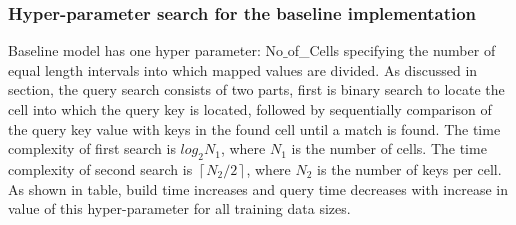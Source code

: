 \subsubsection {Hyper-parameter search for the baseline implementation}
Baseline model has one hyper parameter: No$\_$of\_Cells specifying the number of equal length intervals into which mapped values are divided. As discussed in section, the query search consists of two parts, first is binary search to locate the cell into which the query key is located, followed by sequentially comparison of the query key value with keys in the found cell until a match is found. The time complexity of first search is $log_{2}N_{1}$, where $N_{1}$ is the number of cells. The time complexity of second search is  $ \left \lceil {N_{2} / 2}\right \rceil $, where $N_{2}$ is the number of keys per cell. As shown in table, build time increases and query time decreases with increase in value of this hyper-parameter for all training data sizes. 

